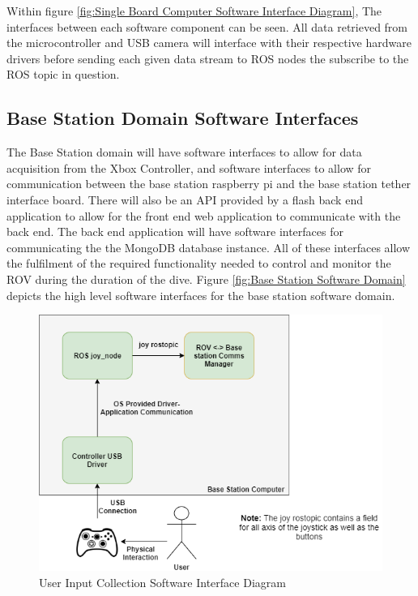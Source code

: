 \documentclass{scrreprt}
\begin{document}
Within figure \ref{fig:Single Board Computer Software Interface Diagram}, The interfaces between each software component can be seen. All data retrieved from the microcontroller and USB camera will interface with their respective hardware drivers before sending each given data stream to ROS nodes the subscribe to the ROS topic in question. 

\subsection{Base Station Domain Software Interfaces}
The Base Station domain will have software interfaces to allow for data acquisition from the Xbox Controller, and software interfaces to allow for communication between the base station raspberry pi and the base station tether interface board. There will also be an API provided by a flash back end application to allow for the front end web application to communicate with the back end. The back end application will have software interfaces for communicating the the MongoDB database instance. All of these interfaces allow the fulfilment of the required functionality needed to control and monitor the ROV during the duration of the dive. Figure \ref{fig:Base Station Software Domain} depicts the high level software interfaces for the base station software domain.

\begin{figure}[!ht]
    \centering
    \includegraphics[scale=0.45]{UserInputCollection.png}
    \caption{User Input Collection Software Interface Diagram}
    \label{fig:User Input Collection Software Interface Diagram}
\end{figure}
\FloatBarrier
\end{document}
